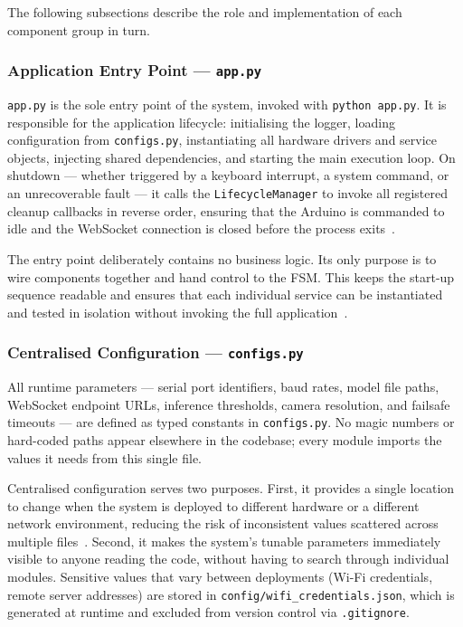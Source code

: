 The following subsections describe the role and implementation of each
component group in turn.
 
\subsubsection{Application Entry Point — \texttt{app.py}}
 
\texttt{app.py} is the sole entry point of the system, invoked with
\texttt{python app.py}. It is responsible for the application
lifecycle: initialising the logger, loading configuration from
\texttt{configs.py}, instantiating all hardware drivers and service
objects, injecting shared dependencies, and starting the main
execution loop. On shutdown — whether triggered by a keyboard
interrupt, a system command, or an unrecoverable fault — it calls the
\texttt{LifecycleManager} to invoke all registered cleanup callbacks
in reverse order, ensuring that the Arduino is commanded to idle and
the WebSocket connection is closed before the process
exits~\cite{gamma1994design}.
 
The entry point deliberately contains no business logic. Its only
purpose is to wire components together and hand control to the FSM.
This keeps the start-up sequence readable and ensures that each
individual service can be instantiated and tested in isolation without
invoking the full application~\cite{martin2008clean}.
 
\subsubsection{Centralised Configuration — \texttt{configs.py}}
 
All runtime parameters — serial port identifiers, baud rates, model
file paths, WebSocket endpoint URLs, inference thresholds, camera
resolution, and failsafe timeouts — are defined as typed constants in
\texttt{configs.py}. No magic numbers or hard-coded paths appear
elsewhere in the codebase; every module imports the values it needs
from this single file.
 
Centralised configuration serves two purposes. First, it provides a
single location to change when the system is deployed to different
hardware or a different network environment, reducing the risk of
inconsistent values scattered across multiple files~\cite{martin2008clean}.
Second, it makes the system's tunable parameters immediately visible
to anyone reading the code, without having to search through
individual modules. Sensitive values that vary between deployments
(Wi-Fi credentials, remote server addresses) are stored in
\texttt{config/wifi\_credentials.json}, which is generated at runtime
and excluded from version control via \texttt{.gitignore}.
 
